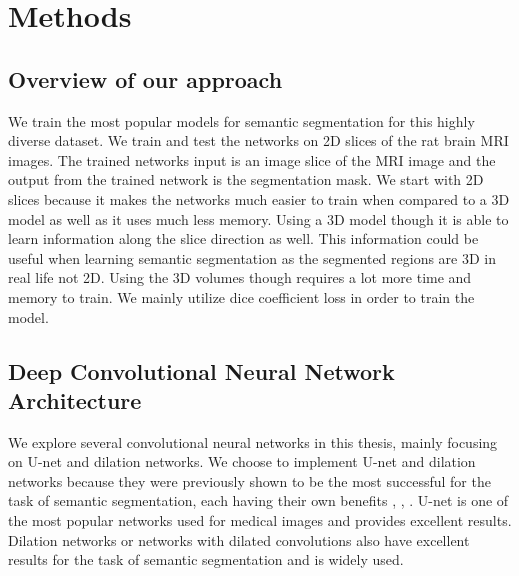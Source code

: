 \chapter{Methods}
%

\section{Overview of our approach}
We train the most popular models for semantic segmentation for this highly diverse dataset. 
We train and test the networks on 2D slices of the rat brain MRI images. 
The trained networks input is an image slice of the MRI image and the output from the trained network is the segmentation mask. 
We start with 2D slices because it makes the networks much easier to train when compared to a 3D model as well as it uses much less memory. 
Using a 3D model though it is able to learn information along the slice direction as well. 
This information could be useful when learning semantic segmentation as the segmented regions are 3D in real life not 2D. 
Using the 3D volumes though requires a lot more time and memory to train. 
We mainly utilize dice coefficient loss in order to train the model.

\section{Deep Convolutional Neural Network Architecture}
We explore several convolutional neural networks in this thesis, mainly focusing on U-net and dilation networks. 
We choose to implement U-net and dilation networks because they were previously shown to be the most successful for the task of semantic segmentation, each having their own benefits \cite{DBLP:journals/corr/LongSD14}, \cite{DBLP:journals/corr/RonnebergerFB15}, \cite{Yu2016MultiScaleCA}. 
U-net is one of the most popular networks used for medical images and provides excellent results. 
Dilation networks or networks with dilated convolutions also have excellent results for the task of semantic segmentation and is widely used. 


